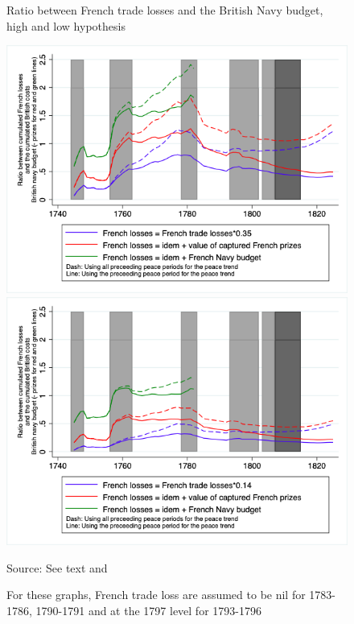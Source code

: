 \documentclass[12pt,a4paper,notitlepage,english]{article}
\newcommand{\source}[1]{\caption*{\footnotesize Source: {#1}} }
\begin{document}
\begin{center}
	\begin{figure}[H]
		\caption{Ratio between French trade losses and the British Navy budget, high and low hypothesis}
		\label{Ratio_BR_Expenditures}
		\centering
		\includegraphics[scale=0.4]{Ratio_BR_Expenditures_Annual_LossH.png}
		\includegraphics[scale=0.4]{Ratio_BR_Expenditures_Annual_LossL.png}
		\source{See text and \cite[pp. 570-587]{mitchell1988}}
	    \caption*{For these graphs, French trade loss are assumed to be nil for 1783-1786, 1790-1791 and at the 1797 level for 1793-1796}
	\end{figure}
\end{center}
\end{document}
